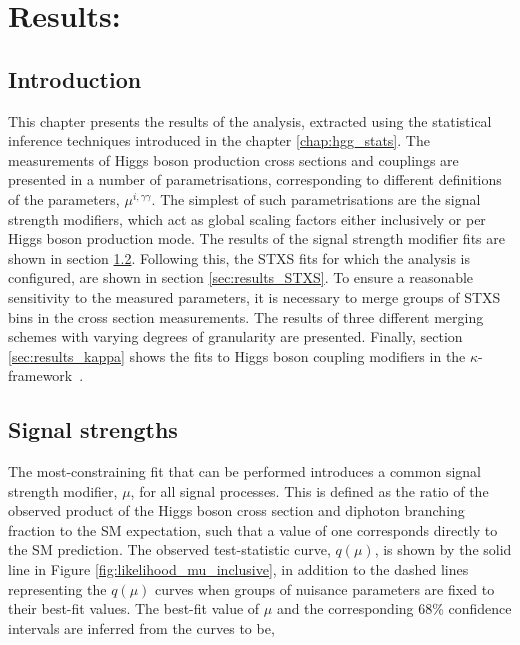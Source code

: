 \chapter{Results: \Hgg}
\label{chap:hgg_results}

\section{Introduction}
This chapter presents the results of the \Hgg analysis, extracted using the statistical inference techniques introduced in the chapter \ref{chap:hgg_stats}. The measurements of Higgs boson production cross sections and couplings are presented in a number of parametrisations, corresponding to different definitions of the parameters, $\mu^{i,\gamma\gamma}$. The simplest of such parametrisations are the signal strength modifiers, which act as global scaling factors either inclusively or per Higgs boson production mode. The results of the signal strength modifier fits are shown in section \ref{sec:results_mu}. Following this, the STXS fits for which the analysis is configured, are shown in section \ref{sec:results_STXS}. To ensure a reasonable sensitivity to the measured parameters, it is necessary to merge groups of STXS bins in the cross section measurements. The results of three different merging schemes with varying degrees of granularity are presented. Finally, section \ref{sec:results_kappa} shows the fits to Higgs boson coupling modifiers in the $\kappa$-framework~\cite{Heinemeyer:2013tqa}.

\section{Signal strengths}\label{sec:results_mu}
The most-constraining fit that can be performed introduces a common signal strength modifier, $\mu$, for all signal processes. This is defined as the ratio of the observed product of the Higgs boson cross section and diphoton branching fraction to the SM expectation, such that a value of one corresponds directly to the SM prediction. The observed test-statistic curve, $q(\mu)$, is shown by the solid line in Figure \ref{fig:likelihood_mu_inclusive}, in addition to the dashed lines representing the $q(\mu)$ curves when groups of nuisance parameters are fixed to their best-fit values. The best-fit value of $\mu$ and the corresponding 68\% confidence intervals are inferred from the curves to be,

